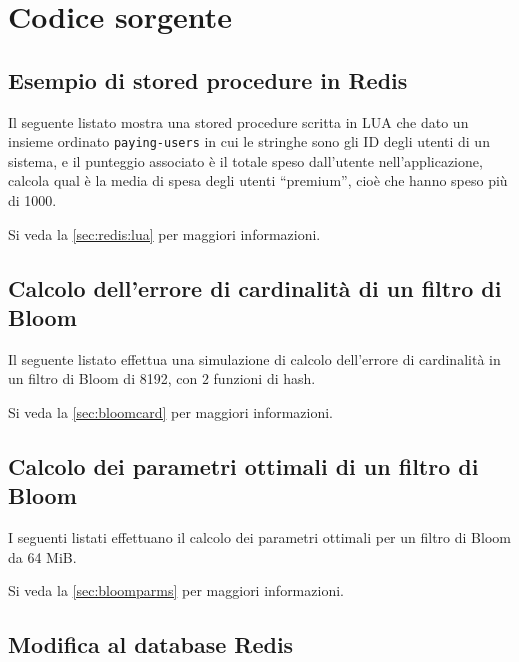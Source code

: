 \chapter{Codice sorgente}

\section{Esempio di stored procedure in Redis}

Il seguente listato mostra una stored procedure scritta in LUA che dato un insieme ordinato
\verb|paying-users| in cui le stringhe sono gli ID degli utenti di un sistema, e il punteggio
associato è il totale speso dall'utente nell'applicazione, calcola qual è la media di spesa degli
utenti ``premium'', cioè che hanno speso più di \SI{1000}{\EUR}.

Si veda la \autoref{sec:redis:lua} per maggiori informazioni.



\section{Calcolo dell'errore di cardinalità di un filtro di Bloom}

Il seguente listato effettua una simulazione di calcolo dell'errore di cardinalità in un filtro
di Bloom di \SI{8192}{\bit}, con $2$ funzioni di hash.

Si veda la \autoref{sec:bloomcard} per maggiori informazioni.



\section{Calcolo dei parametri ottimali di un filtro di Bloom}

I seguenti listati effettuano il calcolo dei parametri ottimali per un filtro di Bloom da 64 MiB.

Si veda la \autoref{sec:bloomparms} per maggiori informazioni.



\section{Modifica al database Redis}
\label{sec:modredis}

